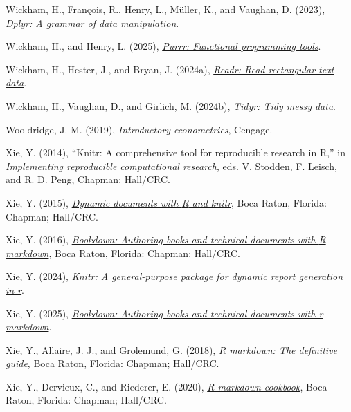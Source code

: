 \documentclass[
  10pt,
  a4paper,
  twoside]{article}
\newlength{\cslhangindent}
\newenvironment{CSLReferences}[2] %
 {\begin{list}{}{%
  \setlength{\itemindent}{0pt}
  \setlength{\leftmargin}{0pt}
  \setlength{\parsep}{0pt}
  \ifodd #1
   \setlength{\leftmargin}{\cslhangindent}
   \setlength{\itemindent}{-1\cslhangindent}
  \fi
  \setlength{\itemsep}{#2\baselineskip}}}
 {\end{list}}
\begin{document}
\begin{CSLReferences}{1}{0}
Wickham, H., François, R., Henry, L., Müller, K., and Vaughan, D. (2023), \emph{\href{https://CRAN.R-project.org/package=dplyr}{Dplyr: A grammar of data manipulation}}.

Wickham, H., and Henry, L. (2025), \emph{\href{https://CRAN.R-project.org/package=purrr}{Purrr: Functional programming tools}}.

Wickham, H., Hester, J., and Bryan, J. (2024a), \emph{\href{https://CRAN.R-project.org/package=readr}{Readr: Read rectangular text data}}.

Wickham, H., Vaughan, D., and Girlich, M. (2024b), \emph{\href{https://CRAN.R-project.org/package=tidyr}{Tidyr: Tidy messy data}}.

Wooldridge, J. M. (2019), \emph{Introductory econometrics}, Cengage.

Xie, Y. (2014), {``Knitr: A comprehensive tool for reproducible research in {R},''} in \emph{Implementing reproducible computational research}, eds. V. Stodden, F. Leisch, and R. D. Peng, Chapman; Hall/CRC.

Xie, Y. (2015), \emph{\href{https://yihui.org/knitr/}{Dynamic documents with {R} and knitr}}, Boca Raton, Florida: Chapman; Hall/CRC.

Xie, Y. (2016), \emph{\href{https://bookdown.org/yihui/bookdown}{Bookdown: Authoring books and technical documents with {R} markdown}}, Boca Raton, Florida: Chapman; Hall/CRC.

Xie, Y. (2024), \emph{\href{https://yihui.org/knitr/}{Knitr: A general-purpose package for dynamic report generation in r}}.

Xie, Y. (2025), \emph{\href{https://github.com/rstudio/bookdown}{Bookdown: Authoring books and technical documents with r markdown}}.

Xie, Y., Allaire, J. J., and Grolemund, G. (2018), \emph{\href{https://bookdown.org/yihui/rmarkdown}{R markdown: The definitive guide}}, Boca Raton, Florida: Chapman; Hall/CRC.

Xie, Y., Dervieux, C., and Riederer, E. (2020), \emph{\href{https://bookdown.org/yihui/rmarkdown-cookbook}{R markdown cookbook}}, Boca Raton, Florida: Chapman; Hall/CRC.


\end{CSLReferences}
\end{document}
